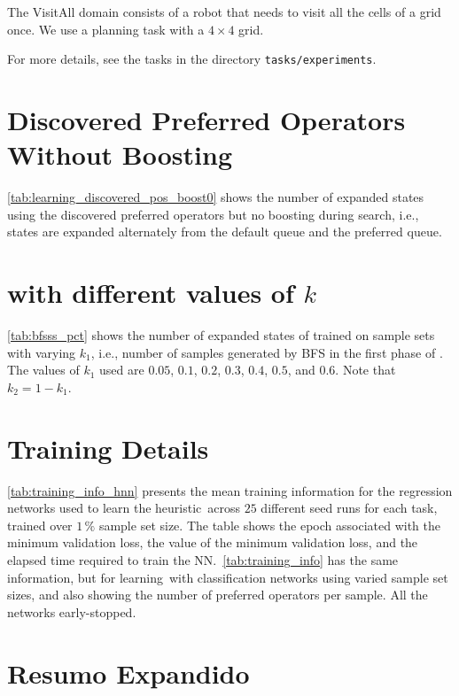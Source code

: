 \documentclass[ppgc,diss,english]{iiufrgs}
\begin{document}
The VisitAll domain consists of a robot that needs to visit all the cells of a grid once. We use a planning task with a $4 \times 4$ grid.

For more details, see the tasks in the directory \texttt{tasks/experiments}.

\chapter[Preferred Operators Without Boosting]{Discovered Preferred Operators Without Boosting}
\label{cha:discovered_pos_boost0}
\cref{tab:learning_discovered_pos_boost0} shows the number of expanded states using the discovered preferred operators \pog but no boosting during search, i.e., states are expanded alternately from the default queue and the preferred queue.



\chapter{\bfsrs with different values of $k$}
\label{cha:bfsss_pct}

\cref{tab:bfsss_pct} shows the number of expanded states of \pog trained on sample sets with varying $k_{1}$, i.e., number of samples generated by BFS in the first phase of \bfsrs. The values of $k_{1}$ used are $0.05$, $0.1$, $0.2$, $0.3$, $0.4$, $0.5$, and $0.6$. Note that $k_{2} = 1 - k_{1}$.



\chapter{Training Details}

\cref{tab:training_info_hnn} presents the mean training information for the regression networks used to learn the heuristic~\hnn across $25$ different seed runs for each task, trained over $1\,\%$ sample set size. The table shows the epoch associated with the minimum validation loss, the value of the minimum validation loss, and the elapsed time required to train the NN.~\cref{tab:training_info} has the same information, but for learning~\pog with classification networks using varied sample set sizes, and also showing the number of preferred operators per sample. All the networks early-stopped.



\chapter{Resumo Expandido}
\noindent
\end{document}
